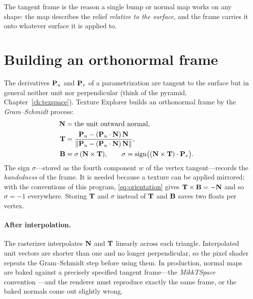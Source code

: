 The tangent frame is the reason a single bump or normal map works on any shape: the map
describes the relief \emph{relative to the surface}, and the frame carries it onto whatever
surface it is applied to.

\section{Building an orthonormal frame}

The derivatives $\mathbf{P}_u$ and $\mathbf{P}_v$ of a parametrization are tangent to the surface but
in general neither unit nor perpendicular (think of the pyramid, Chapter~\ref{ch:texspace}).
Texture Explorer builds an orthonormal frame by the \emph{Gram--Schmidt} process:
\begin{align*}
  \mathbf{N} &= \text{the unit outward normal},\\
  \mathbf{T} &= \frac{\mathbf{P}_u - (\mathbf{P}_u\cdot\mathbf{N})\,\mathbf{N}}{\lVert\mathbf{P}_u - (\mathbf{P}_u\cdot\mathbf{N})\,\mathbf{N}\rVert},\\
  \mathbf{B} &= \sigma\,(\mathbf{N}\times\mathbf{T}),\qquad \sigma = \operatorname{sign}\bigl((\mathbf{N}\times\mathbf{T})\cdot\mathbf{P}_v\bigr).
\end{align*}
The sign $\sigma$---stored as the fourth component $w$ of the vertex tangent---records the
\emph{handedness} of the frame. It is needed because a texture can be applied mirrored; with
the conventions of this program, \eqref{eq:orientation} gives $\mathbf{T}\times\mathbf{B}=-\mathbf{N}$ and so
$\sigma=-1$ everywhere. Storing $\mathbf{T}$ and $\sigma$ instead of $\mathbf{T}$ and $\mathbf{B}$ saves two floats
per vertex.

\paragraph{After interpolation.} The rasterizer interpolates $\mathbf{N}$ and $\mathbf{T}$ linearly across
each triangle. Interpolated unit vectors are shorter than one and no longer perpendicular, so the
pixel shader repeats the Gram--Schmidt step before using them. In production, normal maps are
baked against a precisely specified tangent frame---the \emph{MikkTSpace} convention
\cite{mikkelsen2008}---and the renderer must reproduce exactly the same frame, or the baked
normals come out slightly wrong.

